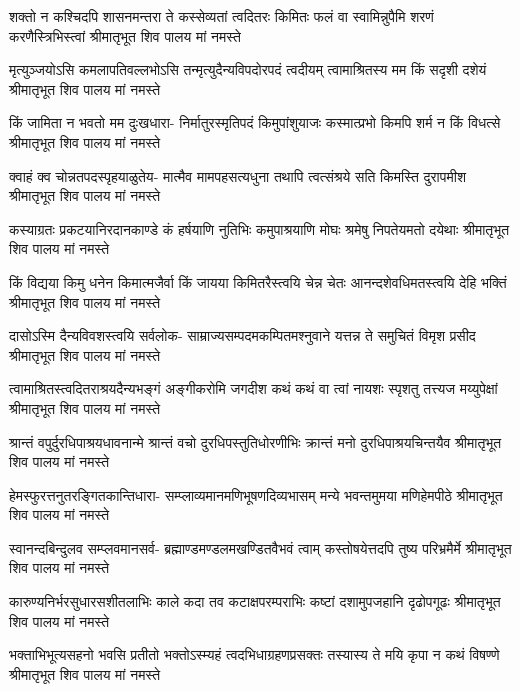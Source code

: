 \fourlineindentedshloka
{शक्तो न कश्चिदपि शासनमन्तरा ते}
{कस्सेव्यतां त्वदितरः किमितः फलं वा}
{स्वामिन्नुपैमि शरणं करणैस्त्रिभिस्त्वां}
{श्रीमातृभूत शिव पालय मां नमस्ते} %

\fourlineindentedshloka
{मृत्युञ्जयोऽसि कमलापतिवल्लभोऽसि}
{तन्मृत्युदैन्यविपदोरपदं त्वदीयम्}
{त्वामाश्रितस्य मम किं सदृशी दशेयं}
{श्रीमातृभूत शिव पालय मां नमस्ते} %

\fourlineindentedshloka
{किं जामिता न भवतो मम दुःखधारा-}
{निर्मातुरस्मृतिपदं किमुपांशुयाजः}
{कस्मात्प्रभो किमपि शर्म न किं विधत्से}
{श्रीमातृभूत शिव पालय मां नमस्ते} %

\fourlineindentedshloka
{क्वाहं क्व चोन्नतपदस्पृहयाळुतेय-}
{मात्मैव मामपहसत्यधुना तथापि}
{त्वत्संश्रये सति किमस्ति दुरापमीश}
{श्रीमातृभूत शिव पालय मां नमस्ते} %

\fourlineindentedshloka
{कस्याग्रतः प्रकटयानिरदानकाण्डे}
{कं हर्षयाणि नुतिभिः कमुपाश्रयाणि}
{मोघः श्रमेषु निपतेयमतो दयेथाः}
{श्रीमातृभूत शिव पालय मां नमस्ते} %

\fourlineindentedshloka
{किं विद्यया किमु धनेन किमात्मजैर्वा}
{किं जायया किमितरैस्त्वयि चेन्न चेतः}
{आनन्दशेवधिमतस्त्वयि देहि भक्तिं}
{श्रीमातृभूत शिव पालय मां नमस्ते} %

\fourlineindentedshloka
{दासोऽस्मि दैन्यविवशस्त्वयि सर्वलोक-}
{साम्राज्यसम्पदमकम्पितमश्नुवाने}
{यत्तन्न ते समुचितं विमृश प्रसीद}
{श्रीमातृभूत शिव पालय मां नमस्ते} %

\fourlineindentedshloka
{त्वामाश्रितस्त्वदितराश्रयदैन्यभङ्गं}
{अङ्गीकरोमि जगदीश कथं कथं वा}
{त्वां नायशः स्पृशतु तत्त्यज मय्युपेक्षां}
{श्रीमातृभूत शिव पालय मां नमस्ते} %

\fourlineindentedshloka
{श्रान्तं वपुर्दुरधिपाश्रयधावनान्मे}
{श्रान्तं वचो दुरधिपस्तुतिधोरणीभिः}
{क्रान्तं मनो दुरधिपाश्रयचिन्तयैव}
{श्रीमातृभूत शिव पालय मां नमस्ते} %

\fourlineindentedshloka
{हेमस्फुरत्तनुतरङ्गितकान्तिधारा-}
{सम्प्लाव्यमानमणिभूषणदिव्यभासम्}
{मन्ये भवन्तमुमया मणिहेमपीठे}
{श्रीमातृभूत शिव पालय मां नमस्ते} %

\fourlineindentedshloka
{स्वानन्दबिन्दुलव सम्प्लवमानसर्व-}
{ब्रह्माण्डमण्डलमखण्डितवैभवं त्वाम्}
{कस्तोषयेत्तदपि तुष्य परिभ्रमैर्मे}
{श्रीमातृभूत शिव पालय मां नमस्ते} %

\fourlineindentedshloka
{कारुण्यनिर्भरसुधारसशीतलाभिः}
{काले कदा तव कटाक्षपरम्पराभिः}
{कष्टां दशामुपजहानि दृढोपगूढः}
{श्रीमातृभूत शिव पालय मां नमस्ते} %

\fourlineindentedshloka
{भक्ताभिभूत्यसहनो भवसि प्रतीतो}
{भक्तोऽस्म्यहं त्वदभिधाग्रहणप्रसक्तः}
{तस्यास्य ते मयि कृपा न कथं विषण्णे}
{श्रीमातृभूत शिव पालय मां नमस्ते} %

